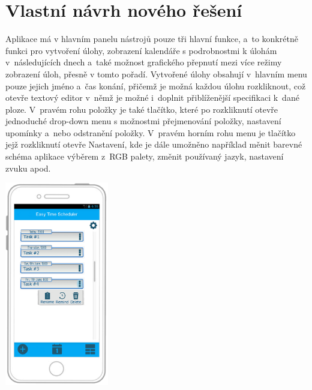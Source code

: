 \documentclass[a4paper, 11pt, twocolumn]{article}
\begin{document}
	\section*{\large{\centering Vlastní návrh nového řešení}}
	\vspace*{-0.2cm}
	Aplikace má v hlavním panelu nástrojů pouze tři hlavní funkce, a~to konkrétně funkci pro vytvoření úlohy, zobrazení kalendáře s podrobnostmi k úlohám 
	v~následujících dnech a~také možnost grafického přepnutí mezi více režimy zobrazení úloh, přesně v tomto pořadí. Vytvořené úlohy obsahují v~hlavním 
	menu pouze jejich jméno a~čas konání, přičemž je možná každou úlohu rozkliknout, což otevře textový editor v~němž je možné i~doplnit přiblíženější 
	specifikaci k~dané ploze. V~pravém rohu položky je také tlačítko, které po rozkliknutí otevře jednoduché drop-down menu s možnostmi přejmenování 
	položky, nastavení upomínky a~nebo odstranění položky. V~pravém horním rohu menu je tlačítko jejž rozkliknutí otevře Nastavení, kde je dále 
	umožněno například měnit barevné schéma aplikace výběrem z~RGB palety, změnit používaný jazyk, nastavení zvuku apod.
	\vspace*{-0.1cm}
	\begin{center}
	\includegraphics[width=0.34\textwidth]{timeplanner}
	\end{center}

	\newpage


\end{document}
